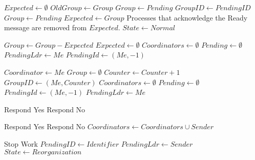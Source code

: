 \begin{algorithmic}[1]
\State

    \State $Expected \gets \emptyset$
        \State $OldGroup \gets Group$
            \State $Group \gets Pending$
            \State $GroupID \gets PendingID$
        \Else
            \State $Group \gets Pending$
        \EndIf
        \State $Expected \gets Group$
        \EndFor
        \State Processes that acknowledge the Ready message are removed from $Expected$.
    \EndIf
    \State $State \gets Normal$
\EndFunction

\State

        \State $Group \gets Group - Expected$
    \EndIf
    \State $Expected \gets \emptyset$
    \State $Coordinators \gets \emptyset$
    \State $Pending \gets \emptyset$
    \State $PendingLdr \gets Me$
    \State $PendingId \gets (Me, -1)$
    \EndIf
\EndFunction

\State

    \State $Coordinator \gets Me$
    \State $Group \gets \emptyset$
    \State $Counter \gets Counter+1$
    \State $GroupID \gets (Me,Counter)$
    \State $Coordinators \gets \emptyset$
    \State $Pending \gets \emptyset$
    \State $PendingId \gets (Me, -1)$
    \State $PendingLdr \gets Me$
\EndFunction

\State

        \State Respond Yes
    \Else
        \State Respond No
    \EndIf
\EndFunction

\State

        \State Respond Yes
    \Else
        \State Respond No
        \State $Coordinators \gets Coordinators \cup Sender$
    \EndIf
\EndFunction

\State

        \Return
    \EndIf
    \State Stop Work
    \State $PendingID \gets Identifier$
    \State $PendingLdr \gets Sender$
    \State $State \gets Reorganization$
\EndFunction


\end{algorithmic}
